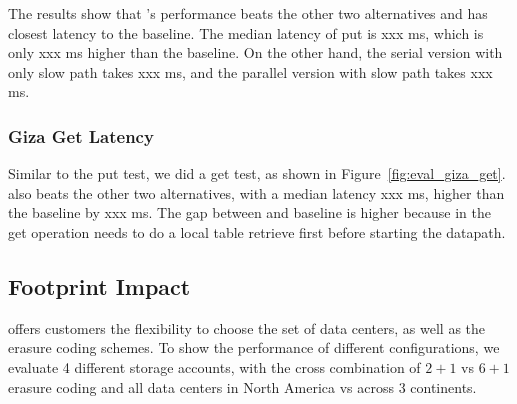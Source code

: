 The results show that \name's performance beats the other two alternatives and has closest
latency to the baseline. The median latency of \name put is xxx ms, which is only xxx ms
higher than the baseline. On the other hand, the serial version with only slow path takes 
xxx ms, and the parallel version with slow path takes xxx ms.

\subsubsection{Giza Get Latency}

Similar to the put test, we did a \name get test, as shown in Figure~\ref{fig:eval_giza_get}. 
\name also beats the other two alternatives, with a median latency xxx ms, higher than 
the baseline by xxx ms. The gap between \name and baseline is higher because in the get 
operation \name needs to do a local table retrieve first before starting the datapath. 





\subsection{Footprint Impact}



\name offers customers the flexibility to choose the set of data centers, as well as the 
erasure coding schemes. To show the performance of different configurations, we evaluate 
4 different \name storage accounts, with the cross combination of $2+1$ vs $6+1$ erasure 
coding and all data centers in North America vs across 3 continents.

